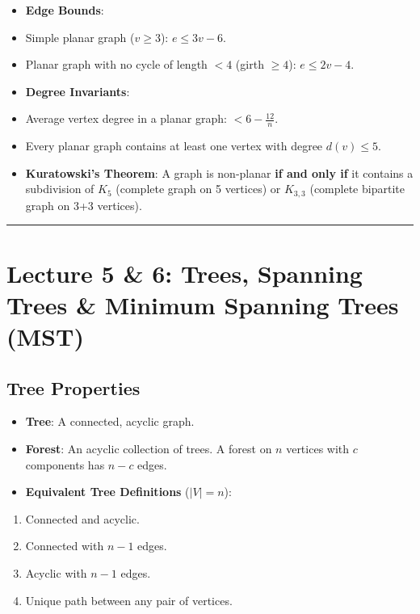 \documentclass[
]{book}
\theoremstyle{definition}
\theoremstyle{definition}
\theoremstyle{definition}
\theoremstyle{definition}
\theoremstyle{remark}
\begin{document}
\begin{itemize}
\item
  \textbf{Edge Bounds}:
\item
  Simple planar graph (\(v \ge 3\)): \(e \le 3v - 6\).
\item
  Planar graph with no cycle of length \(< 4\) (girth \(\ge 4\)): \(e \le 2v - 4\).
\item
  \textbf{Degree Invariants}:
\item
  Average vertex degree in a planar graph: \(< 6 - \frac{12}{n}\).
\item
  Every planar graph contains at least one vertex with degree \(d(v) \le 5\).
\item
  \textbf{Kuratowski's Theorem}: A graph is non-planar \textbf{if and only if} it contains a subdivision of \(K_5\) (complete graph on 5 vertices) or \(K_{3,3}\) (complete bipartite graph on 3+3 vertices).
\end{itemize}

\begin{center}\rule{0.5\linewidth}{0.5pt}\end{center}

\section{Lecture 5 \& 6: Trees, Spanning Trees \& Minimum Spanning Trees (MST)}\label{lecture-5-6-trees-spanning-trees-minimum-spanning-trees-mst}

\subsection{Tree Properties}\label{tree-properties}

\begin{itemize}
\item
  \textbf{Tree}: A connected, acyclic graph.
\item
  \textbf{Forest}: An acyclic collection of trees. A forest on \(n\) vertices with \(c\) components has \(n - c\) edges.
\item
  \textbf{Equivalent Tree Definitions} (\(\vert{}V\vert{} = n\)):
\end{itemize}

\begin{enumerate}
\def\labelenumi{\arabic{enumi}.}
\item
  Connected and acyclic.
\item
  Connected with \(n - 1\) edges.
\item
  Acyclic with \(n - 1\) edges.
\item
  Unique path between any pair of vertices.
\end{enumerate}
\end{document}
